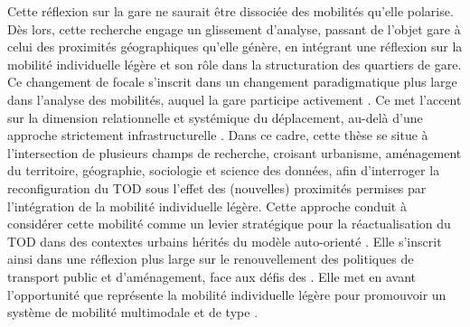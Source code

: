\begin{refsegment}
Cette réflexion sur la gare ne saurait être dissociée des mobilités qu’elle polarise. Dès lors, cette recherche engage un glissement d’analyse, passant de l’objet gare à celui des proximités géographiques qu’elle génère, en intégrant une réflexion sur la mobilité individuelle légère et son rôle dans la structuration des quartiers de gare. Ce changement de focale s’inscrit dans un changement paradigmatique plus large dans l’analyse des mobilités, auquel la gare participe activement \textcolor{blue}{\autocite[53]{leheis-guillot_ville_2011}}. Ce  \textcolor{blue}{\autocites{sheller_new_2006}[8]{sheller_mobilizing_2016}[13]{randell_no_2020}} met l’accent sur la dimension relationnelle et systémique du \gls{déplacement}, au-delà d’une approche strictement infrastructurelle \textcolor{blue}{\autocite[14]{heran_retour_2015}}. Dans ce cadre, cette thèse se situe à l’intersection de plusieurs champs de recherche, croisant urbanisme, aménagement du territoire, géographie, sociologie et science des données, afin d’interroger la reconfiguration du \acrshort{TOD} sous l’effet des (nouvelles) proximités permises par l’intégration de la mobilité individuelle légère. Cette approche conduit à considérer cette mobilité comme un levier stratégique pour la réactualisation du \acrshort{TOD} dans des contextes urbains hérités du modèle auto-orienté \textcolor{blue}{\autocite[209]{heran_retour_2015}}. Elle s’inscrit ainsi dans une réflexion plus large sur le renouvellement des politiques de transport public et d’aménagement, face aux défis des . Elle met en avant l’opportunité que représente la mobilité individuelle légère pour promouvoir un système de mobilité multimodale et de type  \textcolor{blue}{\autocite[979]{lee_bicycle-based_2016}}.%


\end{refsegment}
